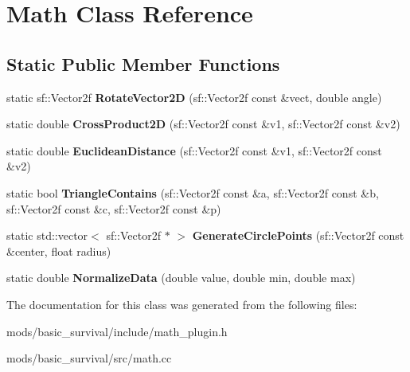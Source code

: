 \section{Math Class Reference}
\label{class_math}
\subsection*{Static Public Member Functions}
\begin{DoxyCompactItemize}
\item 
static sf\+::\+Vector2f {\bfseries Rotate\+Vector2\+D} (sf\+::\+Vector2f const \&vect, double angle)\label{class_math_af9d3404798c8de16c8c3a2b26db1a6c3}

\item 
static double {\bfseries Cross\+Product2\+D} (sf\+::\+Vector2f const \&v1, sf\+::\+Vector2f const \&v2)\label{class_math_a414cd7458586d44b866c35ce4fbc2656}

\item 
static double {\bfseries Euclidean\+Distance} (sf\+::\+Vector2f const \&v1, sf\+::\+Vector2f const \&v2)\label{class_math_a6427533d062847b806e72298750307bb}

\item 
static bool {\bfseries Triangle\+Contains} (sf\+::\+Vector2f const \&a, sf\+::\+Vector2f const \&b, sf\+::\+Vector2f const \&c, sf\+::\+Vector2f const \&p)\label{class_math_a9f1ae3d23538e7e0abfa075657e583f7}

\item 
static std\+::vector$<$ sf\+::\+Vector2f $\ast$ $>$ {\bfseries Generate\+Circle\+Points} (sf\+::\+Vector2f const \&center, float radius)\label{class_math_ae30d3b026356a0d9c9611e9ca6e3ee74}

\item 
static double {\bfseries Normalize\+Data} (double value, double min, double max)\label{class_math_a8c36a62ddc41b11bf332dcb436983454}

\end{DoxyCompactItemize}


The documentation for this class was generated from the following files\+:\begin{DoxyCompactItemize}
\item 
mods/basic\+\_\+survival/include/math\+\_\+plugin.\+h\item 
mods/basic\+\_\+survival/src/math.\+cc\end{DoxyCompactItemize}
